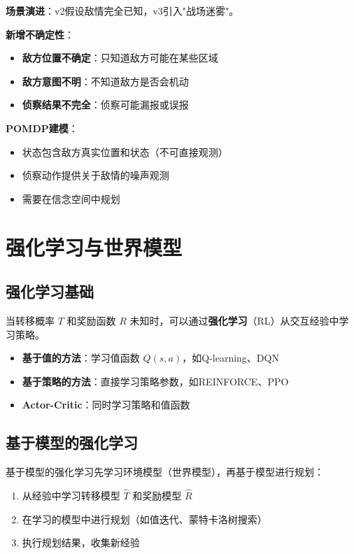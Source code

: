 \begin{caseboxB}
\textbf{场景演进}：v2假设敌情完全已知，v3引入"战场迷雾"。

\textbf{新增不确定性}：
\begin{itemize}
  \item \textbf{敌方位置不确定}：只知道敌方可能在某些区域
  \item \textbf{敌方意图不明}：不知道敌方是否会机动
  \item \textbf{侦察结果不完全}：侦察可能漏报或误报
\end{itemize}

\textbf{POMDP建模}：
\begin{itemize}
  \item 状态包含敌方真实位置和状态（不可直接观测）
  \item 侦察动作提供关于敌情的噪声观测
  \item 需要在信念空间中规划
\end{itemize}
\end{caseboxB}

\section{强化学习与世界模型}

\subsection{强化学习基础}

当转移概率 $T$ 和奖励函数 $R$ 未知时，可以通过\textbf{强化学习}（RL）从交互经验中学习策略。

\begin{itemize}[leftmargin=2em]
  \item \textbf{基于值的方法}：学习值函数 $Q(s,a)$，如Q-learning、DQN
  \item \textbf{基于策略的方法}：直接学习策略参数，如REINFORCE、PPO
  \item \textbf{Actor-Critic}：同时学习策略和值函数
\end{itemize}

\subsection{基于模型的强化学习}

\begin{keypoint}[基于模型的RL与规划]
基于模型的强化学习先学习环境模型（世界模型），再基于模型进行规划：
\begin{enumerate}
  \item 从经验中学习转移模型 $\hat{T}$ 和奖励模型 $\hat{R}$
  \item 在学习的模型中进行规划（如值迭代、蒙特卡洛树搜索）
  \item 执行规划结果，收集新经验
\end{enumerate}
\end{keypoint}

